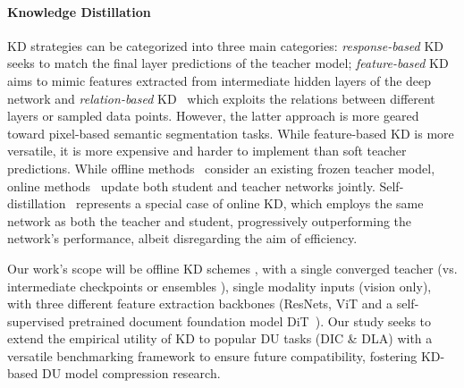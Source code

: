 \documentclass[runningheads]{llncs}
\begin{document}
{    %
}
% 
\paragraph{Knowledge Distillation}


KD strategies can be categorized into three main categories: \textit{response-based} KD~\cite{ba2014deep, hinton2015distilling, aditya2019spatial, mirzadeh2020improved, zhao2022decoupled, yang2023knowledge} seeks to match the final layer predictions of the teacher model; \textit{feature-based} KD~\cite{romero2014fitnets, ahn2019variational, heo2019knowledge,komodakis2017paying, chen2021cross, chen2021distilling} aims to mimic features extracted from intermediate hidden layers of the deep network and \textit{relation-based} KD~\cite{yim2017gift, park2019relational, tian2019contrastive, passalis2020heterogeneous} which exploits the relations between different layers or sampled data points. However, the latter approach is more geared toward pixel-based semantic segmentation tasks. While feature-based KD is more versatile, it is more expensive and harder to implement than soft teacher predictions.
While offline methods~\cite{hinton2015distilling, romero2014fitnets} consider an existing frozen teacher model, online methods~\cite{zhang2018deep, chen2020online} update both student and teacher networks jointly. Self-distillation~\cite{bagherinezhad2018label, zhang2019your} represents a special case of online KD, which employs the same network as both the teacher and student, progressively outperforming the network's performance, albeit disregarding the aim of efficiency.

Our work's scope will be offline KD schemes%
, with a single converged teacher (vs. intermediate checkpoints \cite{wang2022efficient} or ensembles \cite{you2017learning}), single modality inputs (vision only), with three different feature extraction backbones (ResNets, ViT and a self-supervised pretrained document foundation model DiT~\cite{li2022dit}). Our study seeks to extend the empirical utility of KD to popular DU tasks
(DIC \& DLA) with a versatile benchmarking framework to ensure future compatibility, fostering KD-based DU model compression research.
\end{document}
